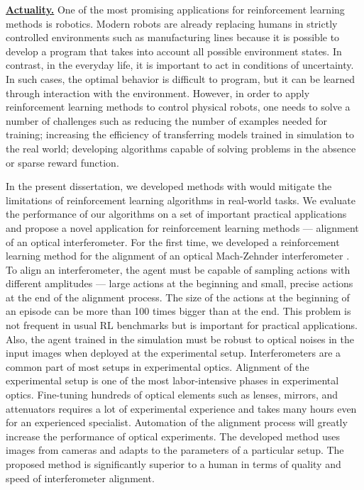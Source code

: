 \underline{\textbf{Actuality.}}  One of the most promising applications for reinforcement learning methods is robotics. Modern robots are already replacing humans in strictly controlled environments such as manufacturing lines because it is possible to develop a program that takes into account all possible environment states. In contrast, in the everyday life, it is important to act in conditions of uncertainty. In such cases, the optimal behavior is difficult to program, but it can be learned through interaction with the environment. However, in order to apply reinforcement learning methods to control physical robots, one needs to solve a number of challenges such as reducing the number of examples needed for training; increasing the efficiency of transferring models trained in simulation to the real world; developing algorithms capable of solving problems in the absence or sparse reward function. 

In the present dissertation, we developed methods with would mitigate the limitations of reinforcement learning algorithms in real-world tasks. We evaluate the performance of our algorithms on a set of important practical applications and propose a novel application for reinforcement learning methods --- alignment of an optical interferometer. 
For the first time, we developed a reinforcement learning method for the alignment of an optical Mach-Zehnder interferometer \cite{interferobot, v2}. To align an interferometer, the agent must be capable of sampling actions with different amplitudes --- large actions at the beginning and small, precise actions at the end of the alignment process. The size of the actions at the beginning of an episode can be more than 100 times bigger than at the end. This problem is not frequent in usual RL benchmarks but is important for practical applications. Also, the agent trained in the simulation must be robust to optical noises in the input images when deployed at the experimental setup. Interferometers are a common part of most setups in experimental optics. Alignment of the experimental setup is one of the most labor-intensive phases in experimental optics. Fine-tuning hundreds of optical elements such as lenses, mirrors, and attenuators requires a lot of experimental experience and takes many hours even for an experienced specialist. Automation of the alignment process will greatly increase the performance of optical experiments. The developed method uses images from cameras and adapts to the parameters of a particular setup. The proposed method is significantly superior to a human in terms of quality and speed of interferometer alignment.


